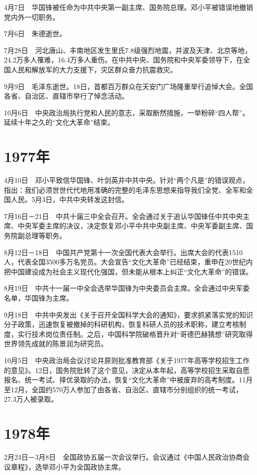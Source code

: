 \documentclass[10pt,a4paper,twocolumn]{book}
\begin{document}
4月7日　华国锋被任命为中共中央第一副主席、国务院总理。邓小平被错误地撤销党内外一切职务。

7月6日　朱德逝世。

7月28日　河北唐山、丰南地区发生里氏7.8级强烈地震，并波及天津、北京等地，24.2万多人罹难，16.4万多人重伤。在中共中央、国务院和中央军委领导下，在全国人民和解放军的大力支援下，灾区群众奋力抗震救灾。

9月9日　毛泽东逝世。18日，首都百万群众在天安门广场隆重举行追悼大会。全国各省、自治区、直辖市举行了悼念活动。

10月6日　中央政治局执行党和人民的意志，采取断然措施，一举粉碎“四人帮”。延续十年之久的“文化大革命”结束。

\section{1977年}

4月10日　邓小平致信华国锋、叶剑英并中共中央。针对“两个凡是”的错误观点，指出：我们必须世世代代地用准确的完整的毛泽东思想来指导我们全党、全军和全国人民。5月3日，中共中央转发这封信。

7月16日－21日　中共十届三中全会召开。全会通过关于追认华国锋任中共中央主席、中央军委主席的决议，决定恢复邓小平中共中央副主席、中央军委副主席、国务院副总理等职务。

8月12日－18日　中国共产党第十一次全国代表大会举行。出席大会的代表1510人，代表全国3500多万名党员。大会宣告“文化大革命”已经结束，重申在20世纪内把中国建设成为社会主义现代化强国，但未能从根本上纠正“文化大革命”的错误。

8月19日　中共十一届一中全会选举华国锋为中央委员会主席。全会通过中央军委名单，华国锋为主席。

9月18日　中共中央发出《关于召开全国科学大会的通知》，要求抓紧落实党的知识分子政策，迅速恢复被撤掉的科研机构，恢复科研人员的技术职称，建立考核制度，实行技术岗位责任制。之后，中国科学院破格晋升对“哥德巴赫猜想”研究取得世界领先成就的陈景润为研究员。

10月5日　中央政治局会议讨论并原则批准教育部《关于1977年高等学校招生工作的意见》。12日，国务院批转了这个意见，决定从本年起，高等学校招生采取自愿报名、统一考试、择优录取的办法，恢复“文化大革命”中被废弃的高考制度。11月至12月，全国约570万人参加了由各省、自治区、直辖市分别组织的统一考试，27.3万人被录取。

\section{1978年}

2月24日－3月8日　全国政协五届一次会议举行。会议通过《中国人民政治协商会议章程》，选举邓小平为全国政协主席。
\end{document}
